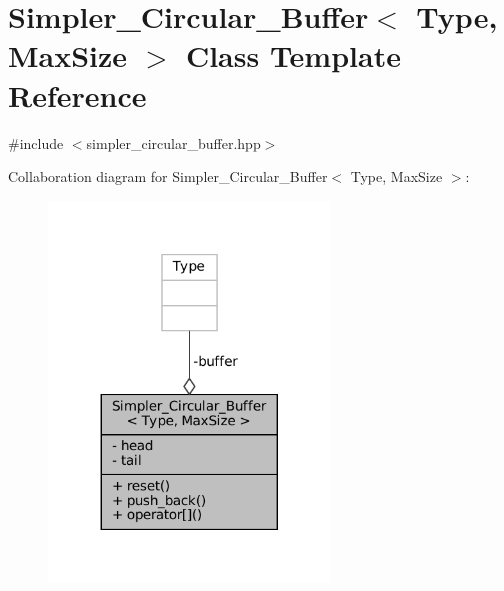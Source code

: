 \hypertarget{classSimpler__Circular__Buffer}{}\section{Simpler\+\_\+\+Circular\+\_\+\+Buffer$<$ Type, Max\+Size $>$ Class Template Reference}
\label{classSimpler__Circular__Buffer}


{\ttfamily \#include $<$simpler\+\_\+circular\+\_\+buffer.\+hpp$>$}



Collaboration diagram for Simpler\+\_\+\+Circular\+\_\+\+Buffer$<$ Type, Max\+Size $>$\+:\nopagebreak
\begin{figure}[H]
\begin{center}
\leavevmode
\includegraphics[width=212pt]{dc/df6/classSimpler__Circular__Buffer__coll__graph}
\end{center}
\end{figure}
